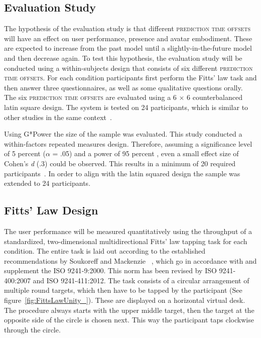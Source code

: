 \documentclass[sigconf]{acmart}
\begin{document}
\subsection{Evaluation Study}
The hypothesis of the evaluation study is that different \textsc{prediction time offsets} will have an effect on user performance, presence and avatar embodiment. These are expected to increase from the past model until a slightly-in-the-future model and then decrease again. 
To test this hypothesis, the evaluation study will be conducted using a within-subjects design that consists of six different \textsc{prediction time offsets}. For each condition participants first perform the Fitts' law task and then answer three questionnaires, as well as some qualitative questions orally. The six \textsc{prediction time offsets} are evaluated using a 6 $\times$ 6 counterbalanced latin square design. The system is tested on 24 participants, which is similar to other studies in the same context~\cite{Kasahara2017, Rietzler2018}.

Using G*Power the size of the sample was evaluated. This study conducted a within-factors repeated measures design. Therefore, assuming a significance level of 5 percent ($\alpha$ = .05) and a power of 95 percent , even a small effect size of Cohen's \textit{d} (.3) could be observed. This results in a minimum of 20 required participants~\cite{Faul2007, Erdfelder2009}. In order to align with the latin squared design the sample was extended to 24 participants. 

\subsection{Fitts' Law Design}\label{sec:FittsLaw}
The user performance will be measured quantitatively using the throughput of a standardized, two-dimensional multidirectional Fitts' law tapping task for each condition. 
The entire task is laid out according to the established recommendations by Soukoreff and Mackenzie ~\cite{A2004}, which go in accordance with and supplement the ISO 9241-9:2000.
This norm has been revised by ISO 9241-400:2007 and ISO 9241-411:2012.
The task consists of a circular arrangement of multiple round targets, which then have to be tapped by the participant (See figure~\ref{fig:FittsLawUnity_}). These are displayed on a horizontal virtual desk.  The procedure always starts with the upper middle target, then the target at the opposite side of the circle is chosen next. This way the participant taps clockwise through the circle.
\end{document}
